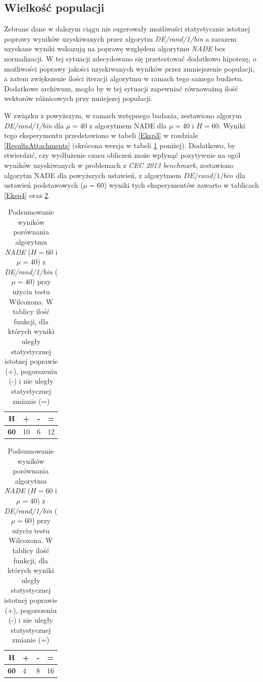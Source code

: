 \documentclass[12pt,a4paper]{report}
\begin{document}
{{{{{{\subsection{Wielkość populacji}
\par{
Zebrane dane w dalszym ciągu nie sugerowały możliwości statystycznie istotnej poprawy wyników uzyskiwanych przez algorytm \emph{DE/rand/1/bin} a zarazem uzyskane wyniki wskazują na poprawę względem algorytmu \emph{NADE} bez normalizacji. W tej sytuacji zdecydowano się przetestować dodatkowo hipotezę, o możliwości poprawy jakości uzyskiwanych wyników przez zmniejszenie populacji, a zatem zwiększenie ilości iteracji algorytmu w ramach tego samego budżetu. Dodatkowe archiwum, mogło by w tej sytuacji zapewniać równoważną ilość wektorów różnicowych przy mniejszej populacji.
}
\par{
W związku z powyższym, w ramach wstępnego badania, zestawiono algorym \emph{DE/rand/1/bin} dla $\mu = 40$ z algorytmem NADE dla $\mu = 40$ i $H = 60$. Wyniki tego eksperymentu przedstawiono w tabeli \ref{Eksp3} w rozdziale \ref{ResultsAttachments} (skrócona wersja w tabeli \ref{eks3summary} poniżej). Dodatkowo, by stwierdzić, czy wydłużenie czasu obliczeń może wpłynąć pozytywnie na ogół wyników uzyskiwanych w problemach z \emph{CEC 2013 benchmark}, zestawiono algorytm NADE dla powyższych ustawień, z algorytmem $DE/rand/1/bin$ dla ustawień podstawowych ($\mu = 60$) wyniki tych eksperymentów zawarto w tablicach \ref{Eksp4} oraz \ref{eks4summary}.
}

\begin{table}[h]
\centering
\caption{Podsumowanie wyników porównania algorytmu \emph{NADE} ($H = 60$ i $\mu = 40$) z \emph{DE/rand/1/bin} ($\mu = 40$) przy użyciu testu Wilcoxona. W tablicy ilość funkcji, dla których wyniki uległy statystycznej istotnej poprawie (+), pogorszeniu (-) i nie uległy statystycznej zmianie (=)}
\label{eks3summary}
\begin{tabular}{|l|l|l|l|}
\hline
\multicolumn{1}{|c|}{{\bf H}} & \multicolumn{1}{c|}{{\bf +}} & \multicolumn{1}{c|}{{\bf -}} & \multicolumn{1}{c|}{{\bf =}} \\ \hline
{\bf 60} & 10 & 6 & 12 \\ \hline
\end{tabular}
\end{table}

\begin{table}[h]
\centering
\caption{Podsumowanie wyników porównania algorytmu \emph{NADE} ($H = 60$ i $\mu = 40$) z \emph{DE/rand/1/bin} ($\mu = 60$) przy użyciu testu Wilcoxona. W tablicy ilość funkcji, dla których wyniki uległy statystycznej istotnej poprawie (+), pogorszeniu (-) i nie uległy statystycznej zmianie (=)}
\label{eks4summary}
\begin{tabular}{|l|l|l|l|}
\hline
\multicolumn{1}{|c|}{{\bf H}} & \multicolumn{1}{c|}{{\bf +}} & \multicolumn{1}{c|}{{\bf -}} & \multicolumn{1}{c|}{{\bf =}} \\ \hline
{\bf 60} & 4 & 8 & 16 \\ \hline
\end{tabular}
\end{table}

}}}}}}
\end{document}
